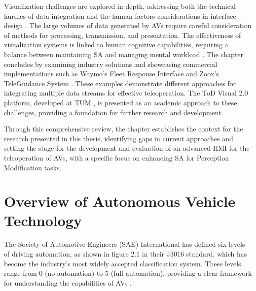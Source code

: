 Visualization challenges are explored in depth, addressing both the technical hurdles of data integration and the human factors considerations
in interface design \cite{sworder1999performance,Gnatzig}. The large volumes of data generated by \acp{AV} require careful consideration of methods for
processing, transmission, and presentation. The effectiveness of visualization systems is linked to human cognitive capabilities,
requiring a balance between maintaining \ac{SA} and managing mental workload \cite{wickens2008multiple}.
The chapter concludes by examining industry solutions and showcasing commercial implementations such as Waymo's Fleet Response Interface and
Zoox's TeleGuidance System \cite{waymo2024fleetresponse,zoox2024teleguidance}. These examples demonstrate different approaches for integrating
multiple data streams for effective teleoperation. The ToD Visual 2.0 platform, developed at TUM \cite{Schimpe}, is presented as an academic approach to these challenges, providing a foundation for further research and development.

Through this comprehensive review, the chapter establishes the context for the research presented in this thesis,
identifying gaps in current approaches and setting the stage for the development and evaluation of an advanced
\ac{HMI} for the teleoperation of \acp{AV}, with a specific focus on enhancing \ac{SA} for Perception Modification tasks.

\section{Overview of Autonomous Vehicle Technology}

The Society of Automotive Engineers (SAE) International has defined six levels of
driving automation, as shown in figure 2.1 in their J3016 standard, which has become
the industry's most widely accepted classification system. These levels range from 0
(no automation) to 5 (full automation), providing a clear framework for understanding
the capabilities of \acp{AV} \cite{sae2021}.


